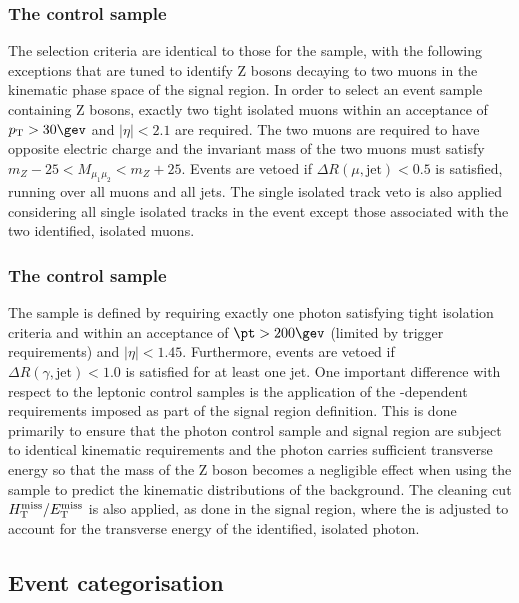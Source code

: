 \subsubsection{The \texorpdfstring{\mmj}{di-muon plus jets} control sample}
\label{sec:mumucontrolSelection}

The selection criteria are identical to those for the \mj sample, with
the following exceptions that are tuned to identify Z bosons decaying
to two muons in the kinematic phase space of the signal region. 
In order to select an event sample containing Z bosons, exactly two
tight isolated muons within an acceptance of $\Pt > 30\gev$ and
$|\eta| < 2.1$ are required. The two muons are required to have opposite electric charge 
and the invariant mass of the two muons must satisfy $m_{Z} - 25 < M_{\mu_1\mu_2} < m_{Z} +25$. 
Events are vetoed if $\Delta R(\mu,\textrm{jet}) < 0.5$ is satisfied, running over all muons
and all jets. The single isolated track veto is also applied
considering all single isolated tracks in the event except those
associated with the two identified, isolated muons. 


\subsubsection{The \texorpdfstring{\gj}{photon plus jets} control sample}
\label{sec:photoncontrolSelection}

The \gj sample is defined by requiring exactly one photon satisfying
tight isolation criteria and within an acceptance of $\pt > 200\gev$
(limited by trigger requirements) and $|\eta| < 1.45$. Furthermore,
events are vetoed if $\Delta R(\gamma,\textrm{jet}) < 1.0$ is
satisfied for at least one jet. One important difference with
respect to the leptonic control samples is the application of the
\HT-dependent \alphat requirements imposed as part of the signal
region definition. This is done primarily to ensure that the photon
control sample and signal region are subject to identical kinematic
requirements and the photon carries sufficient transverse energy so
that the mass of the Z boson becomes a negligible effect when using
the \gj sample to predict the kinematic distributions of the \znunu
background. The cleaning cut $\mbox{$H_{\rm T}^{\rm miss}$}/\mbox{$E_\text{T}^{\rm miss}$}$ is also applied, as done in
the signal region, where the \met is adjusted to account for the
transverse energy of the identified, isolated photon. 


\subsection{Event categorisation}
\label{sec:event-categorisation}

